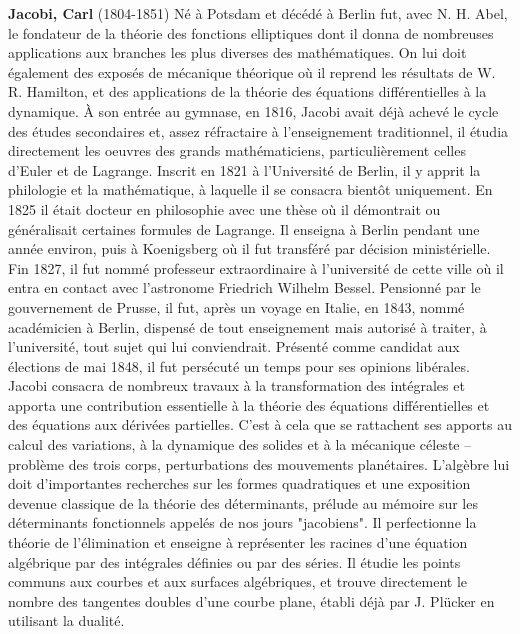 {}
\label{sec:J}

\textbf{Jacobi, Carl} (1804-1851) Né à Potsdam et décédé à Berlin fut, avec N. H. Abel, le fondateur de la théorie des fonctions elliptiques dont il donna de nombreuses applications aux branches les plus diverses des mathématiques. On lui doit également des exposés de mécanique théorique où il reprend les résultats de W. R. Hamilton, et des applications de la théorie des équations différentielles à la dynamique. À son entrée au gymnase, en 1816, Jacobi avait déjà achevé le cycle des études secondaires et, assez réfractaire à l'enseignement traditionnel, il étudia directement les oeuvres des grands mathématiciens, particulièrement celles d'Euler et de Lagrange. Inscrit en 1821 à l'Université de Berlin, il y apprit la philologie et la mathématique, à laquelle il se consacra bientôt uniquement. En 1825 il était docteur en philosophie avec une thèse où il démontrait ou généralisait certaines formules de Lagrange. Il enseigna à Berlin pendant une année environ, puis à Koenigsberg où il fut transféré par décision ministérielle. Fin 1827, il fut nommé professeur extraordinaire à l'université de cette ville où il entra en contact avec l'astronome Friedrich Wilhelm Bessel. Pensionné par le gouvernement de Prusse, il fut, après un voyage en Italie, en 1843, nommé académicien à Berlin, dispensé de tout enseignement mais autorisé à traiter, à l'université, tout sujet qui lui conviendrait. Présenté comme candidat aux élections de mai 1848, il fut persécuté un temps pour ses opinions libérales. Jacobi consacra de nombreux travaux à la transformation des intégrales et apporta une contribution essentielle à la théorie des équations différentielles et des équations aux dérivées partielles. C'est à cela que se rattachent ses apports au calcul des variations, à la dynamique des solides et à la mécanique céleste – problème des trois corps, perturbations des mouvements planétaires. L'algèbre lui doit d'importantes recherches sur les formes quadratiques et une exposition devenue classique de la théorie des déterminants, prélude au mémoire sur les déterminants fonctionnels appelés de nos jours "jacobiens". Il perfectionne la théorie de l'élimination et enseigne à représenter les racines d'une équation algébrique par des intégrales définies ou par des séries. Il étudie les points communs aux courbes et aux surfaces algébriques, et trouve directement le nombre des tangentes doubles d'une courbe plane, établi déjà par J. Plücker en utilisant la dualité.

